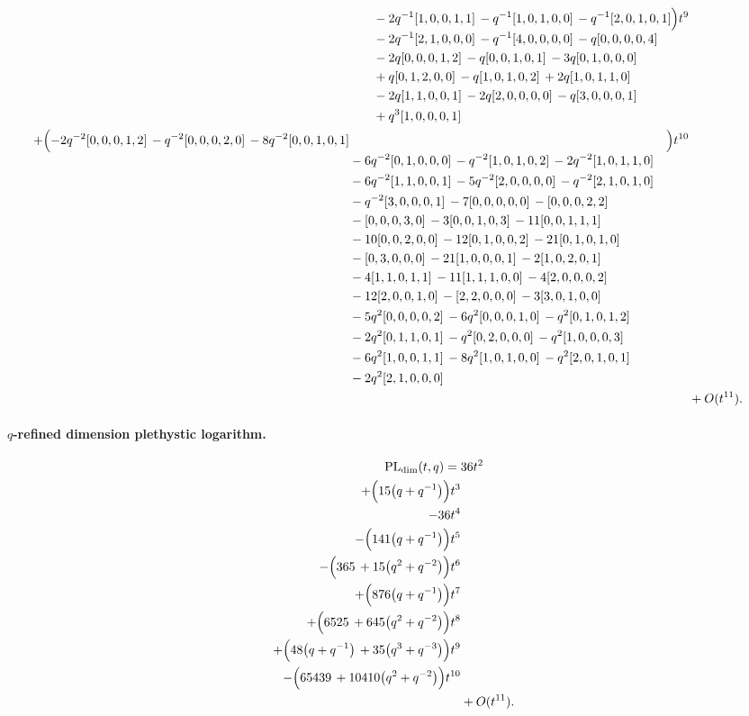 \documentclass[10pt]{article}
\begin{document}
\[\begin{aligned}
\begin{aligned}[t]
  &{}-2q^{-1}[1,0,0,1,1]\,-q^{-1}[1,0,1,0,0]\,-q^{-1}[2,0,1,0,1] \\
  &{}-2q^{-1}[2,1,0,0,0]\,-q^{-1}[4,0,0,0,0]\,-q[0,0,0,0,4] \\
  &{}-2q[0,0,0,1,2]\,-q[0,0,1,0,1]\,-3q[0,1,0,0,0] \\
  &{}+q[0,1,2,0,0]\,-q[1,0,1,0,2]\,+2q[1,0,1,1,0] \\
  &{}-2q[1,1,0,0,1]\,-2q[2,0,0,0,0]\,-q[3,0,0,0,1] \\
  &{}+q^{3}[1,0,0,0,1]\end{aligned}\Bigr)t^{9} \\
  + \Bigl(\begin{aligned}[t]-2q^{-2}[0,0,0,1,2]\,-q^{-2}[0,0,0,2,0]\,-8q^{-2}[0,0,1,0,1] \\
  &{}-6q^{-2}[0,1,0,0,0]\,-q^{-2}[1,0,1,0,2]\,-2q^{-2}[1,0,1,1,0] \\
  &{}-6q^{-2}[1,1,0,0,1]\,-5q^{-2}[2,0,0,0,0]\,-q^{-2}[2,1,0,1,0] \\
  &{}-q^{-2}[3,0,0,0,1]\,-7[0,0,0,0,0]\,-[0,0,0,2,2] \\
  &{}-[0,0,0,3,0]\,-3[0,0,1,0,3]\,-11[0,0,1,1,1] \\
  &{}-10[0,0,2,0,0]\,-12[0,1,0,0,2]\,-21[0,1,0,1,0] \\
  &{}-[0,3,0,0,0]\,-21[1,0,0,0,1]\,-2[1,0,2,0,1] \\
  &{}-4[1,1,0,1,1]\,-11[1,1,1,0,0]\,-4[2,0,0,0,2] \\
  &{}-12[2,0,0,1,0]\,-[2,2,0,0,0]\,-3[3,0,1,0,0] \\
  &{}-5q^{2}[0,0,0,0,2]\,-6q^{2}[0,0,0,1,0]\,-q^{2}[0,1,0,1,2] \\
  &{}-2q^{2}[0,1,1,0,1]\,-q^{2}[0,2,0,0,0]\,-q^{2}[1,0,0,0,3] \\
  &{}-6q^{2}[1,0,0,1,1]\,-8q^{2}[1,0,1,0,0]\,-q^{2}[2,0,1,0,1] \\
  &{}-2q^{2}[2,1,0,0,0]\end{aligned}\Bigr)t^{10} \\
  &+ O(t^{11}).
\end{aligned}
\]
\paragraph{$q$-refined dimension plethystic logarithm.}
\[
\begin{aligned}
\operatorname{PL}_{\mathrm{dim}}(t,q) ={}&
   36t^{2} \\
  + \Bigl(15\bigl(q+q^{-1}\bigr)\Bigr)t^{3} \\
  -36t^{4} \\
  -\Bigl(141\bigl(q+q^{-1}\bigr)\Bigr)t^{5} \\
  -\Bigl(365\,+15\bigl(q^{2}+q^{-2}\bigr)\Bigr)t^{6} \\
  + \Bigl(876\bigl(q+q^{-1}\bigr)\Bigr)t^{7} \\
  + \Bigl(6525\,+645\bigl(q^{2}+q^{-2}\bigr)\Bigr)t^{8} \\
  + \Bigl(48\bigl(q+q^{-1}\bigr)\,+35\bigl(q^{3}+q^{-3}\bigr)\Bigr)t^{9} \\
  -\Bigl(65439\,+10410\bigl(q^{2}+q^{-2}\bigr)\Bigr)t^{10} \\
  &+ O(t^{11}).
\end{aligned}
\]
\end{document}
